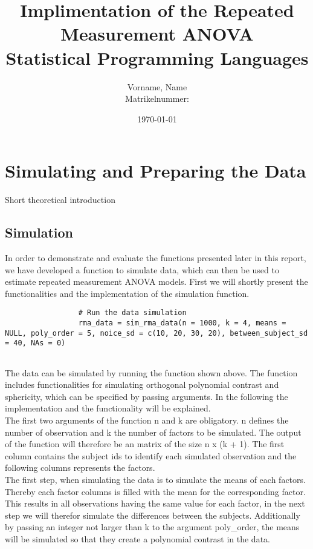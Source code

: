 \documentclass[11pt]{article}
\author{Vorname, Name\\Matrikelnummer: }
\title{\textbf{Implimentation of the Repeated Measurement ANOVA}\\ Statistical Programming Languages \\[5cm]}
\date{\today}
\begin{document}
	\maketitle
	\thispagestyle{fancy}
	\newpage
	\tableofcontents
	\newpage
	\section{Simulating and Preparing the Data}
	Short theoretical introduction
		\subsection{Simulation}
				 In order to demonstrate and evaluate the functions presented later in this report, we have developed a function to simulate data, which can then be used to estimate repeated measurement ANOVA models. First we will shortly present the functionalities and the implementation of the simulation function.\\
				 
				 \begin{lstlisting}
				 # Run the data simulation
				 rma_data = sim_rma_data(n = 1000, k = 4, means = NULL, poly_order = 5, noice_sd = c(10, 20, 30, 20), between_subject_sd = 40, NAs = 0)
				 
				 \end{lstlisting}
				 
				 The data can be simulated by running the function shown above. The function includes functionalities for simulating orthogonal polynomial contrast and sphericity, which can be specified by passing arguments. In the following the implementation and the functionality will be explained.\\
				 
				 The first two arguments of the function n and k are obligatory. n defines the number of observation and k the number of factors to be simulated. The output of the function will therefore be an matrix of the size n x (k + 1). The first column contains the subject ids to identify each simulated observation and the following columns represents the factors.\\
				 
				 The first step, when simulating the data is to simulate the means of each factors. Thereby each factor columns is filled with the mean for the corresponding factor. This results in all observations having the same value for each factor, in the next step we will therefor simulate the differences between the subjects.  Additionally by passing an integer not larger than k to the argument poly\_order, the means will be simulated so that they create a polynomial contrast in the data.\\
				 
\end{document}
